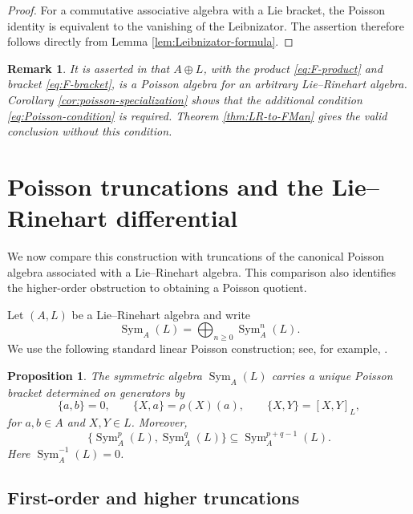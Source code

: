 \documentclass[10pt,a4paper]{amsart}
\newtheorem{proposition}[theorem]{Proposition}
\newtheorem{remark}[theorem]{Remark}
\newcommand{\Sym}{\operatorname{Sym}}
\begin{document}
	\begin{proof}
		For a commutative associative algebra with a Lie bracket, the Poisson identity
		is equivalent to the vanishing of the Leibnizator.  The assertion therefore
		follows directly from Lemma \ref{lem:Leibnizator-formula}.
	\end{proof}
	
	\begin{remark}\label{rem:LV-poisson-claim}
		It is asserted in \cite[Proposition 13.3.26]{LodayVallette} that $A\oplus L$,
		with the product \eqref{eq:F-product} and bracket \eqref{eq:F-bracket}, is a
		Poisson algebra for an arbitrary Lie--Rinehart algebra.  Corollary
		\ref{cor:poisson-specialization} shows that the additional condition
		\eqref{eq:Poisson-condition} is required.  Theorem
		\ref{thm:LR-to-FMan} gives the valid conclusion without this condition.
	\end{remark}
	
	
	
	
	
	\section{Poisson truncations and the Lie--Rinehart differential}
	\label{sec:ideal}
	
	We now compare this construction with truncations of the canonical
	Poisson algebra associated with a Lie--Rinehart algebra.  This comparison
	also identifies the higher-order obstruction to obtaining a Poisson
	quotient.
	
	Let $(A,L)$ be a Lie--Rinehart algebra and write
	\[
	\Sym_A(L)=\bigoplus_{n\geq0}\Sym_A^n(L).
	\]
	We use the following standard linear Poisson construction; see, for example,
	\cite{Huebschmann1990,Huebschmann1998}.
	
	\begin{proposition}\label{prop:linear-poisson-prelim}
		The symmetric algebra $\Sym_A(L)$ carries a unique Poisson bracket
		determined on generators by
		\begin{equation}\label{eq:linear-poisson}
			\{a,b\}=0,
			\qquad
			\{X,a\}=\rho(X)(a),
			\qquad
			\{X,Y\}=[X,Y]_L,
		\end{equation}
		for $a,b\in A$ and $X,Y\in L$.  Moreover,
		\[
		\{\Sym_A^p(L),\Sym_A^q(L)\}\subseteq \Sym_A^{p+q-1}(L).
		\]
		Here $\Sym_A^{-1}(L)=0$.
	\end{proposition}
	
	\subsection{First-order and higher truncations}
	
\end{document}
